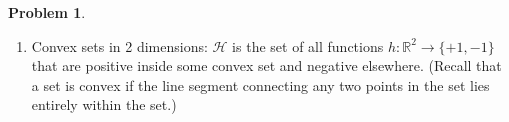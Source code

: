 \documentclass[10pt]{exam}
\theoremstyle{definition}
\newtheorem{problem}{Problem}
\newtheorem{defn}{Definition}
\newcommand{\R}{\mathbb R}
\DeclareMathOperator*{\argmin}{arg\,min}
\newcommand{\Eout}{E_{\text{out}}}
\newcommand{\x}{\mathbf x}
\newcommand{\ltwo}[1]{{\lVert {#1} \rVert}_2}
\newcommand{\HH}[1]{\mathcal H_{\text{#1}}}
\begin{document}
\begin{problem}
\begin{enumerate}
%

    \item Convex sets in 2 dimensions:
        $\mathcal H$ is the set of all functions $h : \R^2 \to \{+1, -1\}$ that are positive inside some convex set and negative elsewhere.
            (Recall that a set is convex if the line segment connecting any two points in the set lies entirely within the set.)
\vspace{4in}

    \end{enumerate}
\end{problem}



\end{document}
